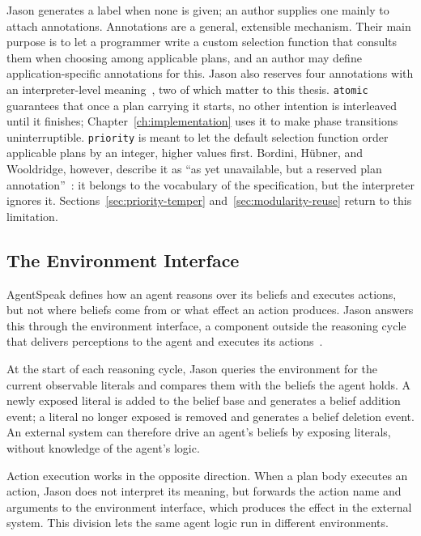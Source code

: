 Jason generates a label when none is given; an author supplies one mainly to attach annotations. Annotations are a general, extensible mechanism. Their main purpose is to let a programmer write a custom selection function that consults them when choosing among applicable plans, and an author may define application-specific annotations for this. Jason also reserves four annotations with an interpreter-level meaning~\cite{Bordini2007}, two of which matter to this thesis. \lstinline|atomic| guarantees that once a plan carrying it starts, no other intention is interleaved until it finishes; Chapter~\ref{ch:implementation} uses it to make phase transitions uninterruptible. \lstinline|priority| is meant to let the default selection function order applicable plans by an integer, higher values first. Bordini, H\"ubner, and Wooldridge, however, describe it as ``as yet unavailable, but a reserved plan annotation''~\cite{Bordini2007}: it belongs to the vocabulary of the specification, but the interpreter ignores it. Sections~\ref{sec:priority-temper} and~\ref{sec:modularity-reuse} return to this limitation.
 
\subsection{The Environment Interface}
\label{sec:jason-environment}
 
AgentSpeak defines how an agent reasons over its beliefs and executes actions, but not where beliefs come from or what effect an action produces. Jason answers this through the environment interface, a component outside the reasoning cycle that delivers perceptions to the agent and executes its actions~\cite{Bordini2007}.
 
At the start of each reasoning cycle, Jason queries the environment for the current observable literals and compares them with the beliefs the agent holds. A newly exposed literal is added to the belief base and generates a belief addition event; a literal no longer exposed is removed and generates a belief deletion event. An external system can therefore drive an agent's beliefs by exposing literals, without knowledge of the agent's logic.
 
Action execution works in the opposite direction. When a plan body executes an action, Jason does not interpret its meaning, but forwards the action name and arguments to the environment interface, which produces the effect in the external system. This division lets the same agent logic run in different environments.
 
